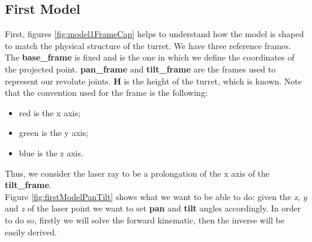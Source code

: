 \subsection{First Model}\label{subs:firstModel}
First, figures \ref{fig:model1FrameCap} helps to understand how the model is shaped to match the physical structure of the turret. We have three reference frames. The \textbf{base\_frame} is fixed and is the one in which we define the coordinates of the projected point. \textbf{pan\_frame} and \textbf{tilt\_frame} are the frames used to represent our revolute joints.
\textbf{H} is the height of the turret, which is known. Note that the convention used for the frame is the following:
\begin{itemize}
    \item red is the x axis;
    \item green is the y axis;
    \item blue is the z axis.
\end{itemize}
Thus, we consider the laser ray to be a prolongation of the x axis of the \textbf{tilt\_frame}. \\
Figure \ref{fig:firstModelPanTilt} shows what we want to be able to do: given the \textit{x}, \textit{y} and \textit{z} of the laser point we want to set \textbf{pan} and \textbf{tilt} angles accordingly. In order to do so, firstly we will solve the forward kinematic, then the inverse will be easily derived.
